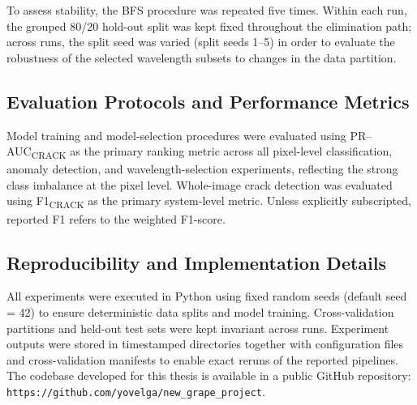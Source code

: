 \medskip
\noindent
To assess stability, the BFS procedure was repeated five times. Within each run, the grouped 80/20 hold-out split was kept fixed throughout the elimination path; across runs, the split seed was varied (split seeds 1--5) in order to evaluate the robustness of the selected wavelength subsets to changes in the data partition.

\subsection{Evaluation Protocols and Performance Metrics}
\label{subsec:evaluation_protocols}

Model training and model-selection procedures were evaluated using
PR--AUC\textsubscript{CRACK} as the primary ranking metric across all
pixel-level classification, anomaly detection, and wavelength-selection
experiments, reflecting the strong class imbalance at the pixel level.
Whole-image crack detection was evaluated using
F1\textsubscript{CRACK} as the primary system-level metric.
Unless explicitly subscripted, reported F1 refers to the weighted F1-score.


\subsection{Reproducibility and Implementation Details}

All experiments were executed in Python using fixed random seeds (default seed = 42) to ensure deterministic data splits and model training. Cross-validation partitions and held-out test sets were kept invariant across runs. Experiment outputs were stored in timestamped directories together with configuration files and cross-validation manifests to enable exact reruns of the reported pipelines.
The codebase developed for this thesis is available in a public GitHub repository: \nolinkurl{https://github.com/yovelga/new_grape_project}.


